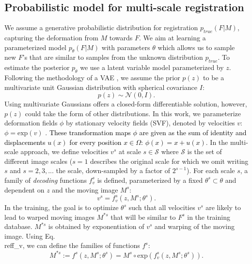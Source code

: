 \documentclass[journal]{IEEEtran}
\newcommand{\update}[1]{\textcolor{black}{#1}}
\begin{document}
\subsection{Probabilistic model for multi-scale registration}
We assume a generative probabilistic distribution for registration $p_{true}(F|M)$, capturing the deformation from $M$ towards $F$. We aim at learning a parameterized model $p_\theta(F|M)$ with parameters $\theta$ which allows us to sample new $F$'s that are similar to samples from the unknown distribution $p_{true}$. To estimate the posterior $p_\theta$ we use a latent variable model parameterized by $z$. %
Following the methodology of a VAE \cite{kingma2013auto}, we assume the prior $p(z)$ to be a multivariate unit Gaussian distribution with spherical covariance $I$:
\begin{equation}\label{p_z}
p(z) \sim \mathcal{N}(0, I).
\end{equation}
Using multivariate Gaussians offers a closed-form differentiable solution, however, $p(z)$ could take the form of other distributions. In this work, we parameterize deformation fields $\phi$ by stationary velocity fields (SVF), denoted by velocities $v$: $\phi=\text{exp}(v)$ \cite{arsigny2006log}. \update{These transformation maps $\phi$ are given as the sum of identity and displacements $u(x)$ for every position $x\in\Omega$: $\phi(x)=x+u(x)$}. In the multi-scale approach, we define velocities $v^s$ at scale $s\in \mathcal{S}$ where $\mathcal{S}$ is the set of different image scales ($s=1$ describes the original scale for which we omit writing $s$ and $s=2,3,...$ the scale, down-sampled by a factor of $2^{s-1}$). For each scale $s$, a family of \emph{decoding} functions $f_v^s$ is defined, parameterized by a fixed $\theta^s \subset \theta$ and dependent on $z$ and the moving image $M^s$: 
\begin{equation}\label{f_v}
v^s = f_v^s(z, M^s; \theta^s).
\end{equation}
In the training, the goal is to optimize $\theta^s$ such that all velocities $v^s$ are likely to lead to warped moving images $M^{*s}$ that will be similar to $F^s$ in the training database.  $M^{*s}$ is obtained by exponentiation of $v^s$ and warping of the moving image. Using Eq.\\ref{f_v}, we can define the families of functions $f^s$: 
\begin{equation}\label{f_}
M^{*s} := f^s(z, M^s; \theta^s) = M^s\circ \text{exp}(f_v^s(z, M^s; \theta^s)).
\end{equation}
\end{document}
